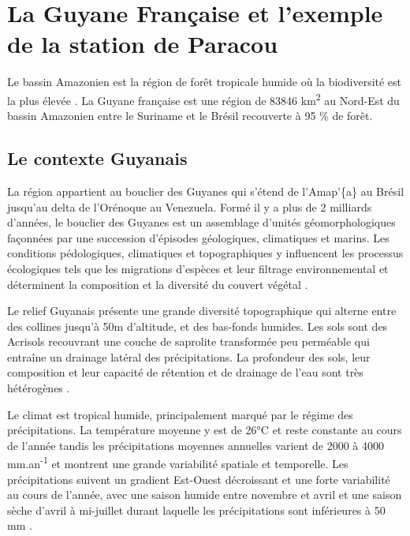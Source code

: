 \documentclass[
  11pt,
  french,
  A4paper,
  extrafontsizes,onecolumn,openright
  ]{memoir}
\begin{document}
\section{La Guyane Française et l'exemple de la station de
Paracou}\label{la-guyane-francaise-et-lexemple-de-la-station-de-paracou}

Le bassin Amazonien est la région de forêt tropicale humide où la
biodiversité est la plus élevée \autocite{Gentry1988}. La Guyane
française est une région de 83846 km\textsuperscript{2} au Nord-Est du
bassin Amazonien entre le Suriname et le Brésil recouverte à 95 \% de
forêt.

\subsection{Le contexte Guyanais}\label{le-contexte-guyanais}

La région appartient au bouclier des Guyanes qui s'étend de l'Amap'\{a\}
au Brésil jusqu'au delta de l'Orénoque au Venezuela. Formé il y a plus
de 2 milliards d'années, le bouclier des Guyanes est un assemblage
d'unités géomorphologiques façonnées par une succession d'épisodes
géologiques, climatiques et marins. Les conditions pédologiques,
climatiques et topographiques y influencent les processus écologiques
tels que les migrations d'espèces et leur filtrage environnemental et
déterminent la composition et la diversité du couvert végétal
\autocite{Guitet2015}.

Le relief Guyanais présente une grande diversité topographique qui
alterne entre des collines jusqu'à 50m d'altitude, et des bas-fonds
humides. Les sols sont des Acrisols recouvrant une couche de saprolite
transformée peu perméable qui entraîne un drainage latéral des
précipitations. La profondeur des sols, leur composition et leur
capacité de rétention et de drainage de l'eau sont très hétérogènes
\autocites{Ferry2010}{Robert2003}.

Le climat est tropical humide, principalement marqué par le régime des
précipitations. La température moyenne y est de 26°C et reste constante
au cours de l'année tandis les précipitations moyennes annuelles varient
de 2000 à 4000 mm.an\textsuperscript{-1} et montrent une grande
variabilité spatiale et temporelle. Les précipitations suivent un
gradient Est-Ouest décroissant et une forte variabilité au cours de
l'année, avec une saison humide entre novembre et avril et une saison
sèche d'avril à mi-juillet durant laquelle les précipitations sont
inférieures à 50 mm \autocite{Wagner2011}.
\end{document}
